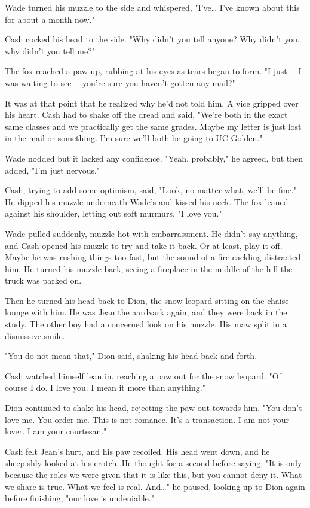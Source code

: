 Wade turned his muzzle to the side and whispered, "I've\ldots{} I've known about this for about a month now."

Cash cocked his head to the side. "Why didn't you tell anyone? Why didn't you\ldots{} why didn't you tell me?"

The fox reached a paw up, rubbing at his eyes as tears began to form. "I just--- I was waiting to see--- you're sure you haven't gotten any mail?"

It was at that point that he realized why he'd not told him. A vice gripped over his heart. Cash had to shake off the dread and said, "We're both in the exact same classes and we practically get the same grades. Maybe my letter is just lost in the mail or something. I'm sure we'll both be going to UC Golden."

Wade nodded but it lacked any confidence. "Yeah, probably," he agreed, but then added, "I'm just nervous."

Cash, trying to add some optimism, said, "Look, no matter what, we'll be fine." He dipped his muzzle underneath Wade's and kissed his neck. The fox leaned against his shoulder, letting out soft murmurs. "I love you."

Wade pulled suddenly, muzzle hot with embarrassment. He didn't say anything, and Cash opened his muzzle to try and take it back. Or at least, play it off. Maybe he was rushing things too fast, but the sound of a fire cackling distracted him. He turned his muzzle back, seeing a fireplace in the middle of the hill the truck was parked on.

Then he turned his head back to Dion, the snow leopard sitting on the chaise lounge with him. He was Jean the aardvark again, and they were back in the study. The other boy had a concerned look on his muzzle. His maw split in a dismissive smile.

"You do not mean that," Dion said, shaking his head back and forth.

Cash watched himself lean in, reaching a paw out for the snow leopard. "Of course I do. I love you. I mean it more than anything."

Dion continued to shake his head, rejecting the paw out towards him. "You don't love me. You order me. This is not romance. It's a transaction. I am not your lover. I am your courtesan."

Cash felt Jean's hurt, and his paw recoiled. His head went down, and he sheepishly looked at his crotch. He thought for a second before saying, "It is only because the roles we were given that it is like this, but you cannot deny it. What we share is true. What we feel is real. And\ldots" he paused, looking up to Dion again before finishing, "our love is undeniable."

